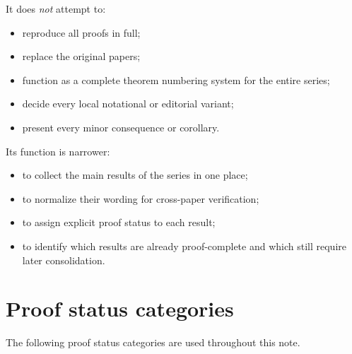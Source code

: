 \documentclass[12pt]{article}
\begin{document}
	It does \emph{not} attempt to:
	\begin{itemize}[leftmargin=2em]
		\item reproduce all proofs in full;
		\item replace the original papers;
		\item function as a complete theorem numbering system for the entire series;
		\item decide every local notational or editorial variant;
		\item present every minor consequence or corollary.
	\end{itemize}
	
	Its function is narrower:
	\begin{itemize}[leftmargin=2em]
		\item to collect the main results of the series in one place;
		\item to normalize their wording for cross-paper verification;
		\item to assign explicit proof status to each result;
		\item to identify which results are already proof-complete and which still require later consolidation.
	\end{itemize}
	
	\section{Proof status categories}
	
	The following proof status categories are used throughout this note.
	
\end{document}
